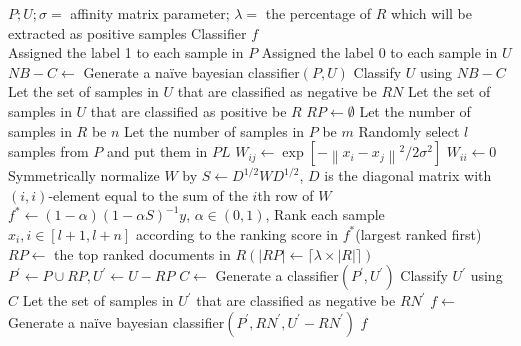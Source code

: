 \documentclass{article}
\begin{document}
\begin{algorithm}[!h]
\renewcommand{\algorithmicrequire}{\textbf{Input:}} %
\renewcommand{\algorithmicensure}{\textbf{Output:}} %
	\caption{PE-PUC} %
	\begin{algorithmic}[1] %
	    \REQUIRE
	    $P;U;\sigma=$ affinity matrix parameter; $\lambda=$ the percentage of $R$ which will be extracted as positive samples 
	    \ENSURE
	    Classifier $f$ \\
		\STATE Assigned the label 1 to each sample in $P$
		\STATE Assigned the label 0 to each sample in $U$
		\STATE $NB-C\leftarrow$ Generate a naïve bayesian classifier$(P,U)$
		\STATE Classify $U$ using $NB-C$
		\STATE Let the set of samples in $U$ that are classified as negative be $RN$
		\STATE Let the set of samples in $U$ that are classified as positive be $R$
        \STATE $RP\leftarrow \emptyset$
        \STATE Let the number of samples in $R$ be $n$
        \STATE Let the number of samples in $P$ be $m$
        \STATE Randomly select $l$ samples from $P$ and put them in $PL$
        \STATE $W_{ij}\leftarrow \exp \left[-\left\|x_{i}-x_{j}\right\|^{2} / 2 \sigma^{2}\right]$
        \ELSE
        \STATE $W_{ii}\leftarrow 0$
        \ENDIF
        \ENDFOR
        \ENDFOR
        \STATE Symmetrically normalize $W$ by $S\leftarrow D^{1/2} W D^{1/2}$, $D$ is the diagonal matrix with $(i,i)$-element equal to the sum of the $i$th row of $W$
        \STATE $f^{*}\leftarrow (1-\alpha)(1-\alpha S)^{-1}y$, $\alpha\in (0,1)$, Rank each sample $x_i,i\in [l+1,l+n]$ according to the ranking score in $f^*$(largest ranked first)
        \STATE $RP\leftarrow$ the top ranked documents in $R(\left|RP\right|\leftarrow \lceil \lambda \times \left|R\right| \rceil)$
        \STATE $P^{'}\leftarrow P\cup RP, U^{'}\leftarrow U-RP$
        \STATE $C\leftarrow$ Generate a classifier$(P^{'},U^{'})$
        \STATE Classify $U^{'}$ using $C$
        \STATE Let the set of samples in $U^{'}$ that are classified as negative be $RN^{'}$
        \STATE $f\leftarrow$ Generate a naïve bayesian classifier$(P^{'},RN^{'},U^{'}-RN^{'})$
		\RETURN $f$
	\end{algorithmic}
\end{algorithm}
\end{document}
